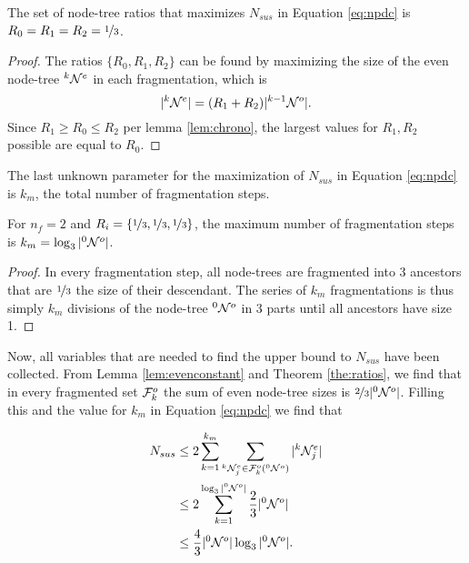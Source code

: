 \begin{theorem}\label{the:ratios}
  The set of node-tree ratios that maximizes $N_{sus}$ in Equation \eqref{eq:npdc} is $R_0 = R_1 = R_2 = \nicefrac{1}{3}$.
\end{theorem}
\begin{proof}
  The ratios $\{R_0, R_1, R_2\}$ can be found by maximizing the size of the even node-tree ${}^{k}\mathcal{N}^e$ in each fragmentation, which is 
  \begin{equation*}
    \lvert{}^{k}\mathcal{N}^e\rvert = (R_1 + R_2)\lvert{}^{k-1}\mathcal{N}^o\rvert.
  \end{equation*}
  Since $ R_1 \geq R_0 \leq R_2$ per lemma \ref{lem:chrono}, the largest values for $R_1, R_2$ possible are equal to $R_0$.
\end{proof}

The last unknown parameter for the maximization of $N_{sus}$ in Equation \eqref{eq:npdc} is $k_m$, the total number of fragmentation steps.

\begin{theorem}\label{the:km}
  For $n_f = 2$ and $R_i = \{\nicefrac{1}{3},\nicefrac{1}{3},\nicefrac{1}{3}\}$, the maximum number of fragmentation steps is $k_m = \log_3{\lvert{}^{0}\mathcal{N}^o\rvert}$.
\end{theorem}
\begin{proof}
  In every fragmentation step, all node-trees are fragmented into 3 ancestors that are $\nicefrac{1}{3}$ the size of their descendant. The series of $k_m$ fragmentations is thus simply $k_m$ divisions of the node-tree ${}^{0}\mathcal{N}^o$ in 3 parts until all ancestors have size 1.
\end{proof}

Now, all variables that are needed to find the upper bound to $N_{sus}$ have been collected. From Lemma \ref{lem:evenconstant} and Theorem \ref{the:ratios}, we find that in every fragmented set $\mathcal{F}^o_k$ the sum of even node-tree sizes is $\nicefrac{2}{3}\lvert{}^{0}\mathcal{N}^o\rvert$. Filling this and the value for $k_m$ in Equation \eqref{eq:npdc} we find that

\begin{align*}
  \nonumber N_{sus} &\leq 2\sum_{k=1}^{k_{m}}{ \sum_{ {}^{k}\mathcal{N}_j^e \in \mathcal{F}^o_k({}^{0}\mathcal{N}^o) }{ \lvert{}^{k}\mathcal{N}_j^e\rvert } } \\
  \nonumber         &\leq 2\sum_{k=1}^{\log_3{\lvert{}^{0}\mathcal{N}^o\rvert}} \frac{2}{3}\lvert{}^{0}\mathcal{N}^o\rvert\\
                    &\leq \frac{4}{3}\lvert{}^{0}\mathcal{N}^o\rvert\log_3{\lvert{}^{0}\mathcal{N}^o\rvert}.
\end{align*}

